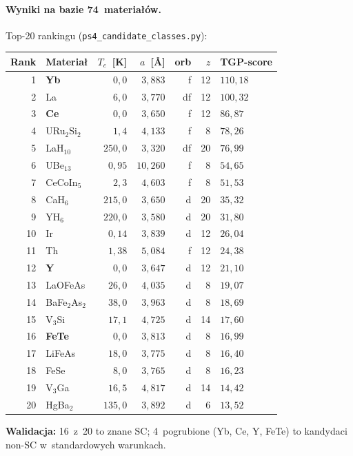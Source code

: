 \paragraph{Wyniki na bazie 74~materia\l{}\'ow.}
Top-20 rankingu (\texttt{ps4\_candidate\_classes.py}):
\begin{center}\scriptsize
\begin{tabular}{@{}rlrrrr l@{}}
\toprule
Rank & Materia\l{} & $T_c$~[K] & $a$~[\AA] & orb & $z$ & TGP-score \\
\midrule
 1 & \textbf{Yb}      & $0{,}0$   & $3{,}883$ & f  & 12 & $110{,}18$ \\
 2 & La               & $6{,}0$   & $3{,}770$ & df & 12 & $100{,}32$ \\
 3 & \textbf{Ce}      & $0{,}0$   & $3{,}650$ & f  & 12 & $86{,}87$ \\
 4 & URu$_2$Si$_2$   & $1{,}4$   & $4{,}133$ & f  &  8 & $78{,}26$ \\
 5 & LaH$_{10}$      & $250{,}0$ & $3{,}320$ & df & 20 & $76{,}99$ \\
 6 & UBe$_{13}$      & $0{,}95$  & $10{,}260$& f  &  8 & $54{,}65$ \\
 7 & CeCoIn$_5$       & $2{,}3$   & $4{,}603$ & f  &  8 & $51{,}53$ \\
 8 & CaH$_6$         & $215{,}0$ & $3{,}650$ & d  & 20 & $35{,}32$ \\
 9 & YH$_6$           & $220{,}0$ & $3{,}580$ & d  & 20 & $31{,}80$ \\
10 & Ir                & $0{,}14$  & $3{,}839$ & d  & 12 & $26{,}04$ \\
11 & Th                & $1{,}38$  & $5{,}084$ & f  & 12 & $24{,}38$ \\
12 & \textbf{Y}       & $0{,}0$   & $3{,}647$ & d  & 12 & $21{,}10$ \\
13 & LaOFeAs           & $26{,}0$  & $4{,}035$ & d  &  8 & $19{,}07$ \\
14 & BaFe$_2$As$_2$    & $38{,}0$  & $3{,}963$ & d  &  8 & $18{,}69$ \\
15 & V$_3$Si           & $17{,}1$  & $4{,}725$ & d  & 14 & $17{,}60$ \\
16 & \textbf{FeTe}    & $0{,}0$   & $3{,}813$ & d  &  8 & $16{,}99$ \\
17 & LiFeAs            & $18{,}0$  & $3{,}775$ & d  &  8 & $16{,}40$ \\
18 & FeSe              & $8{,}0$   & $3{,}765$ & d  &  8 & $16{,}23$ \\
19 & V$_3$Ga           & $16{,}5$  & $4{,}817$ & d  & 14 & $14{,}42$ \\
20 & HgBa$_2$         & $135{,}0$ & $3{,}892$ & d  &  6 & $13{,}52$ \\
\bottomrule
\end{tabular}
\end{center}
\textbf{Walidacja:} 16~z~20 to znane SC; 4~pogrubione (Yb, Ce, Y, FeTe) to
kandydaci non-SC w~standardowych warunkach.

